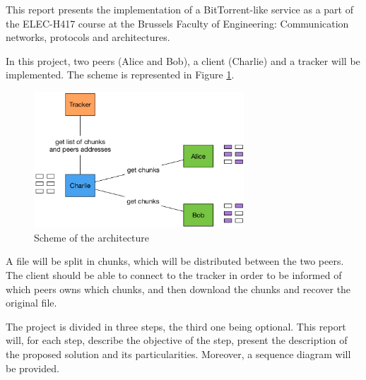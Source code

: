 This report presents the implementation of a BitTorrent-like service as a part of the ELEC-H417 course at the Brussels Faculty of Engineering: Communication networks, protocols and architectures.

In this project, two peers (Alice and Bob), a client (Charlie) and a tracker will be implemented. The scheme is represented in Figure \ref{fig:scheme}. 

\begin{figure}[h]
    \centering
    \includegraphics[width = 0.7\textwidth]{img/scheme.png}
    \caption{Scheme of the architecture}
    \label{fig:scheme}
\end{figure}

A file will be split in chunks, which will be distributed between the two peers. The client should be able to connect to the tracker in order to be informed of which peers owns which chunks, and then download the chunks and recover the original file.

The project is divided in three steps, the third one being optional. This report will, for each step, describe the objective of the step, present the description of the proposed solution and its particularities. Moreover, a sequence diagram will be provided.
